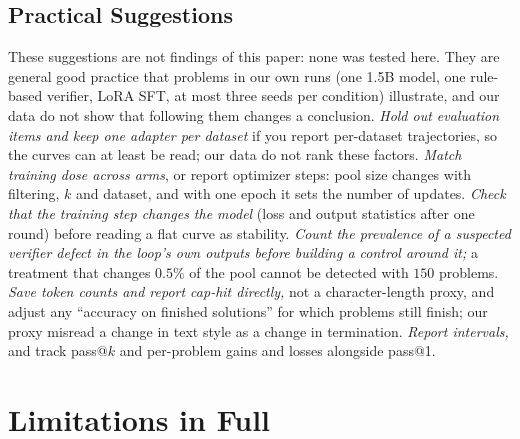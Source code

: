 \documentclass[runningheads]{llncs}
\begin{document}
\subsection{Practical Suggestions}
These suggestions are not findings of this paper: none was tested here. They
are general good practice that problems in our own runs (one 1.5B model, one
rule-based verifier, LoRA SFT, at most three seeds per condition) illustrate,
and our data do not show that following them changes a conclusion.
\emph{Hold out evaluation items and keep one adapter per dataset} if you report
per-dataset trajectories, so the curves can at least be read; our data do not
rank these factors.
\emph{Match training dose across arms}, or report optimizer steps: pool size
changes with filtering, $k$ and dataset, and with one epoch it sets the number of
updates.
\emph{Check that the training step changes the model} (loss and output
statistics after one round) before reading a flat curve as stability.
\emph{Count the prevalence of a suspected verifier defect in the loop's own
outputs before building a control around it;} a treatment that changes $0.5\%$ of
the pool cannot be detected with $150$ problems.
\emph{Save token counts and report cap-hit directly,} not a character-length
proxy, and adjust any ``accuracy on finished solutions'' for which problems
still finish; our proxy misread a change in text style as a change in
termination.
\emph{Report intervals,} and track pass@$k$ and per-problem gains and losses
alongside pass@1.

\section{Limitations in Full}
\label{app:limitations}
\end{document}
